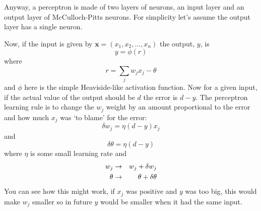 \documentclass[12pt]{article}
\begin{document}
Anyway, a perceptron is made of two layers of neurons, an input layer
and an output layer of McCulloch-Pitts neurons. For simplicity let's
assume the output layer
has a single neuron.
\begin{center}
\end{center}
Now, if the input is given by
$\textbf{x}=(x_1,x_2,\ldots,x_n)$ the output, $y$, is
\begin{equation}
y=\phi(r)
\end{equation}
where
\begin{equation}
r=\sum_j w_j x_j-\theta
\end{equation}
and $\phi$ here is the simple Heaviside-like activation function. Now for a given input, if the actual value of the
output should be $d$ the error is $d-y$. The perceptron learning rule
is to change the $w_j$ weight by an amount proportional to the error
and how much $x_j$ was \lq{}to blame\rq{} for the error:
\begin{equation}
\delta w_j=\eta (d-y) x_j
\end{equation}
and
\begin{equation}
\delta \theta =  \eta (d-y)
\end{equation}
where $\eta$ is some small learning rate and
\begin{eqnarray}
w_j&\rightarrow& w_j+\delta w_j\cr
\theta&\rightarrow& \theta+\delta\theta
\end{eqnarray}
You can see how this might work, if $x_j$ was positive and $y$ was too
big, this would make $w_j$ smaller so in future $y$ would be smaller
when it had the same input. 
\end{document}
